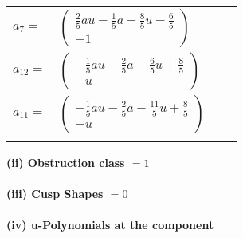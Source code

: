 \documentclass[1p]{elsarticle_modified}
\theoremstyle{definition}
\begin{document}
\begin{tabular}{m{7pt} m{180pt} m{7pt} m{180pt} }
\flushright $a_{7}=$&$\begin{pmatrix}\frac{2}{5} a u-\frac{1}{5} a-\frac{8}{5} u-\frac{6}{5}\\-1\end{pmatrix}$ \\
\flushright $a_{12}=$&$\begin{pmatrix}-\frac{1}{5} a u-\frac{2}{5} a-\frac{6}{5} u+\frac{8}{5}\\- u\end{pmatrix}$ \\
\flushright $a_{11}=$&$\begin{pmatrix}-\frac{1}{5} a u-\frac{2}{5} a-\frac{11}{5} u+\frac{8}{5}\\- u\end{pmatrix}$\\&\end{tabular}
\flushleft \textbf{(ii) Obstruction class $= 1$}\\~\\
\flushleft \textbf{(iii) Cusp Shapes $= 0$}\\~\\
\newpage\renewcommand{\arraystretch}{1}
\flushleft \textbf{(iv) u-Polynomials at the component}\newline \\
\end{document}
